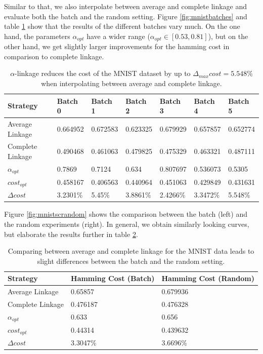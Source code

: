 Similar to that, we also interpolate between average and complete linkage and evaluate both the batch and the random setting. Figure \ref{fig:mnistbatches} and table \ref{table:mnist1000acbatch} show that the results of the different batches vary much. On the one hand, the parameters $\alpha_{opt}$ have a wider range ($\alpha_{opt} \in [0.53,0.81]$), but on the other hand, we get slightly larger improvements for the hamming cost in comparison to complete linkage.

\begin{table}[h]
    \centering
    \begin{tabular}{|l | l l l l l l |}
    \hline
    Strategy & Batch 0 & Batch 1 & Batch 2 & Batch 3 & Batch 4 & Batch 5\\ \hline
    Average Linkage & 0.664952 & 0.672583 & 0.623325 & 0.679929 & 0.657857 & 0.652774\\
    Complete Linkage & 0.490468 & 0.461063 & 0.479825 & 0.475329 & 0.463321 & 0.487111\\
    $\alpha_{opt}$ & 0.7869 & 0.7124 & 0.634 & 0.807697 & 0.536073 & 0.5305\\
    $cost_{opt}$ & 0.458167 & 0.406563 & 0.440964 & 0.451063 & 0.429849 & 0.431631\\
    $\Delta cost$ & 3.2301\% & 5.45\% & 3.8861\% & 2.4266\% & 3.3472\% & 5.548\%\\\hline
    \end{tabular}
    \caption{$\alpha$-linkage reduces the cost of the MNIST dataset by up to $\Delta_{max} cost = 5.548\%$ when interpolating between average and complete linkage.}
    \label{table:mnist1000acbatch}
\end{table}

Figure \ref{fig:mnistscrandom} shows the comparison between the batch (left) and the random experiments (right). In general, we obtain similarly looking curves, but elaborate the results further in table \ref{table:mnistacavg}.

\begin{table}[h]
    \centering
    \begin{tabular}{|l | l | l |}
    \hline
    Strategy & Hamming Cost (Batch) & Hamming Cost (Random)\\ \hline
    Average Linkage & 0.65857 & 0.679936\\
    Complete Linkage & 0.476187 & 0.476328\\
    $\alpha_{opt}$ & 0.633 & 0.656\\
    $cost_{opt}$ & 0.44314 & 0.439632\\
    $\Delta cost$ & 3.3047\% & 3.6696\%\\\hline
    \end{tabular}
    \caption{Comparing between average and complete linkage for the MNIST data leads to slight differences between the batch and the random setting.}
    \label{table:mnistacavg}
\end{table}

